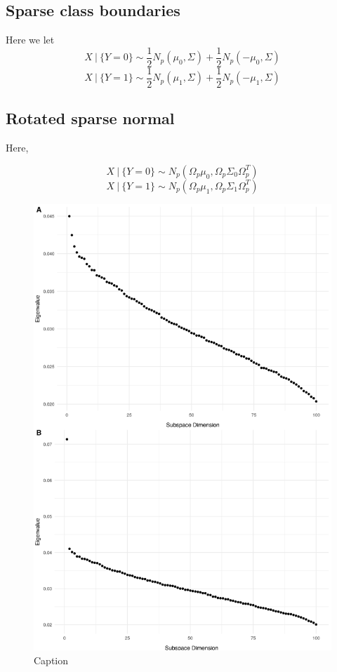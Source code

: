 \documentclass[12pt]{article}
\begin{document}
\subsection{Sparse class boundaries}
Here we let 
\[X \ | \ \{Y = 0\} \sim \frac{1}{2}N_p(\mu_0, \Sigma) + \frac{1}{2}N_p(-\mu_0, \Sigma) \]
\[X \ | \ \{ Y = 1\} \sim \frac{1}{2}N_p(\mu_1, \Sigma) + \frac{1}{2}N_p(-\mu_1, \Sigma) \]



\subsection{Rotated sparse normal}
Here,

\[X \ | \ \{Y=0\} \sim N_p(\Omega_p\mu_0, \Omega_p \Sigma_0 \Omega_p^T)  \] 
\[X \ | \ \{Y = 1\} \sim N_p(\Omega_p\mu_1, \Omega_p\Sigma_1\Omega_p^T)  \]



\begin{figure}
    \centering
    \includegraphics[width=6in]{../results/figures/sim_evs.png}
    \caption{Caption}
    \label{fig:sim1_ev}
\end{figure}
\end{document}
